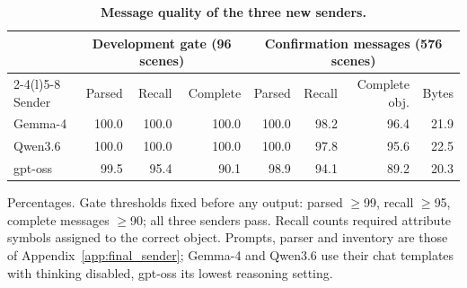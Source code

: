 \begin{table}[!htbp]
\caption{\textbf{Message quality of the three new senders.}}
\label{tab:latest_quality}
\centering\small
\begin{tabular*}{\linewidth}{@{\extracolsep{\fill}}lrrrrrrr@{}}
\toprule
 & \multicolumn{3}{c}{Development gate (96 scenes)} & \multicolumn{4}{c}{Confirmation messages (576 scenes)} \\\cmidrule(lr){2-4}\cmidrule(l){5-8}
Sender & Parsed & Recall & Complete & Parsed & Recall & Complete obj. & Bytes \\
\midrule
Gemma-4 & 100.0 & 100.0 & 100.0 & 100.0 & 98.2 & 96.4 & 21.9 \\
Qwen3.6 & 100.0 & 100.0 & 100.0 & 100.0 & 97.8 & 95.6 & 22.5 \\
gpt-oss & 99.5 & 95.4 & 90.1 & 98.9 & 94.1 & 89.2 & 20.3 \\
\bottomrule
\end{tabular*}
\par\vspace{3pt}
{\footnotesize\raggedright Percentages. Gate thresholds fixed before any output: parsed $\ge$99, recall $\ge$95, complete messages $\ge$90; all three senders pass. Recall counts required attribute symbols assigned to the correct object. Prompts, parser and inventory are those of Appendix~\ref{app:final_sender}; Gemma-4 and Qwen3.6 use their chat templates with thinking disabled, gpt-oss its lowest reasoning setting.\par}
\end{table}
